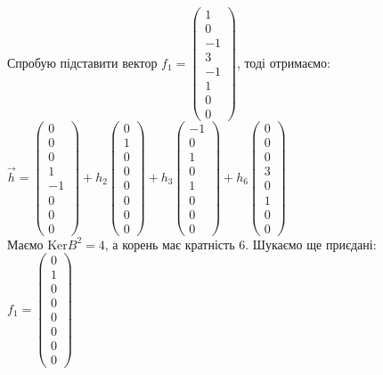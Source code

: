 \documentclass[a4paper, 10pt]{article}
\def\ker#1{\textrm{Ker} {#1}}
\theoremstyle{theoremdd}
\theoremstyle{theoremdd}
\theoremstyle{theoremdd}
\theoremstyle{theoremdd}
\theoremstyle{theoremdd}
\theoremstyle{theoremdd}
\theoremstyle{theoremdd}
\theoremstyle{theoremdd}
\begin{document}
Спробую підставити вектор $f_1 = \begin{pmatrix}
1 \\ 0 \\ -1 \\ 3 \\ -1 \\ 1 \\ 0 \\ 0
\end{pmatrix}$, тоді отримаємо:\\
$\vec{h} = \begin{pmatrix}
0 \\ 0 \\ 0 \\ 1 \\ -1 \\ 0 \\ 0 \\ 0
\end{pmatrix} + h_2 \begin{pmatrix}
0 \\ 1 \\ 0 \\ 0 \\ 0 \\ 0 \\ 0 \\ 0
\end{pmatrix} + h_3 \begin{pmatrix}
-1 \\ 0 \\ 1 \\ 0 \\ 1 \\ 0 \\ 0 \\ 0
\end{pmatrix} + h_6 \begin{pmatrix}
0 \\ 0 \\ 0 \\ 3 \\ 0 \\ 1 \\ 0 \\ 0
\end{pmatrix}$\\
Маємо $\ker B^2 = 4$, а корень має кратність 6. Шукаємо ще приєдані:
\bigskip \\
$f_1 = \begin{pmatrix}
0 \\ 1 \\ 0 \\ 0 \\ 0 \\ 0 \\ 0 \\ 0
\end{pmatrix}$\\
\end{document}
